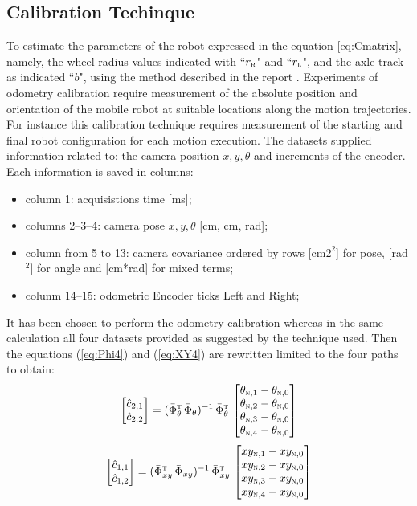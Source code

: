\subsection{Calibration Techinque}
To estimate the parameters of the robot expressed in the equation \ref{eq:Cmatrix}, namely, the wheel radius values indicated with ``$r_\textsc{r}$" and ``$r_\textsc{l}$", and the axle track as indicated ``$b$", using the method described in the report \cite{1512356}.
Experiments of odometry calibration require measurement of the absolute position and orientation of the mobile robot at suitable locations along the motion trajectories. For instance this calibration technique requires measurement of the starting and final robot configuration for each motion execution. The datasets supplied information related to: the camera position $x, y, \theta$ and increments of the encoder.
Each information is saved in columns:
\begin{itemize}
\item column 1: acquisistions time [ms];
\item columns 2--3--4: camera pose $x, y, \theta$ [cm, cm, rad];
\item column from 5 to 13: camera covariance ordered by rows [cm$2^2$] for pose, [rad$^2$] for angle and [cm*rad] for mixed terms;
\item colunm 14--15: odometric Encoder ticks Left and Right;
\end{itemize}
It has been chosen to perform the odometry calibration whereas in the same calculation all four datasets provided as suggested by the technique used. Then the equations (\ref{eq:Phi4}) and (\ref{eq:XY4}) are rewritten limited to the four paths to obtain:
\begin{equation}
\label{eq:Phi4}
	\begin{bmatrix}
		\hat{c}_{2,1}\\
		\hat{c}_{2,2}
	\end{bmatrix} =	(\bar{\Phi}_{\theta}^{\textsc{t}} \, \bar{\Phi}_{\theta})^{-1} \, \bar{\Phi}_{\theta}^{\textsc{t}} \, 
	\begin{bmatrix}
		\theta_{\textsc{n},1} - \theta_{\textsc{n},0}\\
		\theta_{\textsc{n},2} - \theta_{\textsc{n},0}\\
		\theta_{\textsc{n},3} - \theta_{\textsc{n},0}\\
		\theta_{\textsc{n},4} - \theta_{\textsc{n},0}
	\end{bmatrix}
\end{equation}
\begin{equation}
\label{eq:XY4}
	\begin{bmatrix}
		\hat{c}_{1,1}\\
		\hat{c}_{1,2}
	\end{bmatrix} = (\bar{\Phi}_{xy}^{\textsc{t}} \, \bar{\Phi}_{xy})^{-1} \, \bar{\Phi}_{xy}^{\textsc{t}} \, 
	\begin{bmatrix}
		xy_{\textsc{n},1} - xy_{\textsc{n},0}\\
		xy_{\textsc{n},2} - xy_{\textsc{n},0}\\
		xy_{\textsc{n},3} - xy_{\textsc{n},0}\\
		xy_{\textsc{n},4} - xy_{\textsc{n},0}
	\end{bmatrix}
\end{equation}
